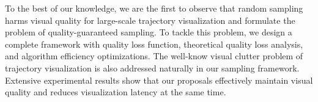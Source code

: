 %
%
%

 To the best of our knowledge, we are the first to observe that random sampling harms visual quality for large-scale trajectory visualization and formulate the problem of quality-guaranteed sampling. To tackle this problem, we design a complete framework with quality loss function, theoretical quality loss analysis, and algorithm efficiency optimizations. The well-know visual clutter problem of trajectory visualization is also addressed naturally in our sampling framework. Extensive experimental results show that our proposals effectively maintain visual quality and reduces visualization latency at the same time.


%
